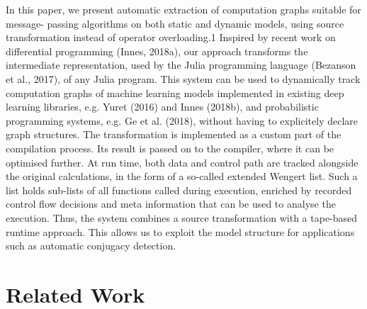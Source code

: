 In this paper, we present automatic extraction of computation graphs suitable for message-
passing algorithms on both static and dynamic models, using source transformation instead of
operator overloading.1 Inspired by recent work on differential programming (Innes, 2018a), our
approach transforms the intermediate representation, used by the Julia programming language
(Bezanson et al., 2017), of any Julia program. This system can be used to dynamically
track computation graphs of machine learning models implemented in existing deep learning
libraries, e.g. Yuret (2016) and Innes (2018b), and probabilistic programming systems, e.g. Ge
et al. (2018), without having to explicitely declare graph structures. The transformation
is implemented as a custom part of the compilation process. Its result is passed on to the
compiler, where it can be optimised further. At run time, both data and control path are
tracked alongside the original calculations, in the form of a so-called extended Wengert list.
Such a list holds sub-lists of all functions called during execution, enriched by recorded control
flow decisions and meta information that can be used to analyse the execution. Thus, the
system combines a source transformation with a tape-based runtime approach. This allows
us to exploit the model structure for applications such as automatic conjugacy detection.



\section{Related Work}
\label{sec:related-work}


